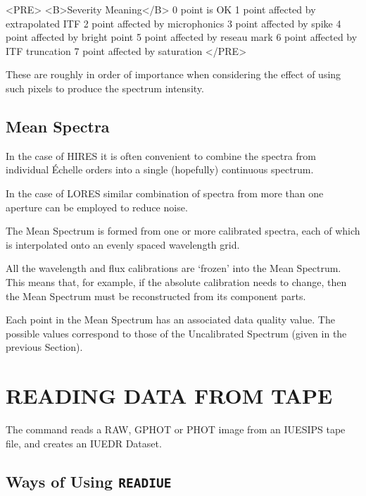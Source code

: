 \begin{htmlonly}
\begin{rawhtml}
<PRE>
<B>Severity   Meaning</B>
   0       point is OK
   1       point affected by extrapolated ITF
   2       point affected by microphonics
   3       point affected by spike
   4       point affected by bright point
   5       point affected by reseau mark
   6       point affected by ITF truncation
   7       point affected by saturation
</PRE>
\end{rawhtml}
\end{htmlonly}

These are roughly in order of importance when considering the effect of using
such pixels to produce the spectrum intensity.


\subsection{Mean Spectra}

In the case of HIRES it is often convenient to combine the spectra from
individual \'{E}chelle orders into a single (hopefully) continuous spectrum.

In the case of LORES similar combination of spectra from more than one
aperture can be employed to reduce noise.

The Mean Spectrum is formed from one or more calibrated spectra, each of which
is interpolated onto an evenly spaced wavelength grid.

All the wavelength and flux calibrations are `frozen' into the Mean
Spectrum.  This means that, for example, if the absolute calibration
needs to change, then the Mean Spectrum must be reconstructed from
its component parts.

Each point in the Mean Spectrum has an associated data quality value.  The
possible values correspond to those of the Uncalibrated Spectrum (given in the
previous Section)\@.


\section{\label{se:readiue}READING DATA FROM TAPE}

The  command reads a RAW, GPHOT or PHOT
image from an IUESIPS tape file, and creates an IUEDR Dataset.

\subsection{Ways of Using {\tt READIUE}}

